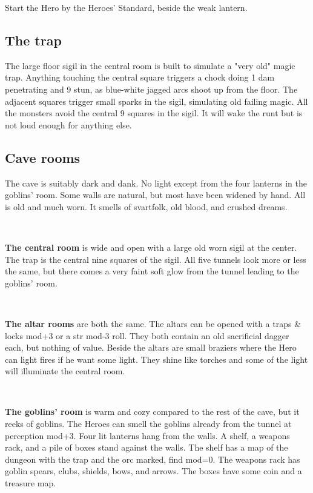Start the Hero by the Heroes' Standard, beside the weak lantern.


\subsection*{The trap}

The large floor sigil in the central room is built to simulate a "very old" magic trap. Anything touching the central square triggers a chock doing 1 dam penetrating and 9 stun, as blue-white jagged arcs shoot up from the floor. The adjacent squares trigger small sparks in the sigil, simulating old failing magic. All the monsters avoid the central 9 squares in the sigil. It will wake the runt but is not loud enough for anything else.


\subsection*{Cave rooms}

The cave is suitably dark and dank. No light except from the four lanterns in the goblins' room. Some walls are natural, but most have been widened by hand. All is old and much worn. It smells of svartfolk, old blood, and crushed dreams.

\

\textbf{The central room} is wide and open with a large old worn sigil at the center. The trap is the central nine squares of the sigil. All five tunnels look more or less the same, but there comes a very faint soft glow from the tunnel leading to the goblins' room.

\

\textbf{The altar rooms} are both the same. The altars can be opened with a traps \& locks mod+3 or a str mod-3 roll. They both contain an old sacrificial dagger each, but nothing of value. Beside the altars are small braziers where the Hero can light fires if he want some light. They shine like torches and some of the light will illuminate the central room.

\

\textbf{The goblins' room} is warm and cozy compared to the rest of the cave, but it reeks of goblins. The Heroes can smell the goblins already from the tunnel at perception mod+3. Four lit lanterns hang from the walls. A shelf, a weapons rack, and a pile of boxes stand against the walls. The shelf has a map of the dungeon with the trap and the orc marked, find mod=0. The weapons rack has goblin spears, clubs, shields, bows, and arrows. The boxes have some coin and a treasure map.

